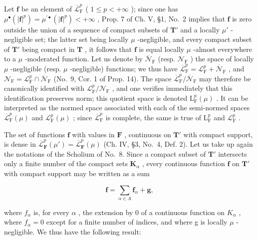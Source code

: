 Let \(\mathbf{f}\) be an element of \(\overline{\mathcal{L}}_{\mathrm{F}}^{p}\) ( \(1 \leqslant p < +\infty\) ); since one has \(\mu^{\bullet}(|\mathbf{f}|^{p}) = \mu^{\prime \bullet}(|\mathbf{f}|^{p}) < +\infty\) , Prop. 7 of Ch. V, §1, No.~2 implies that \(\mathbf{f}\) is zero outside the union of a sequence of compact subsets of \(\mathbf{T}'\) and a locally \(\mu'\) -negligible set; the latter set being locally \(\mu\) -negligible, and every compact subset of \(\mathbf{T}'\) being compact in \(\mathbf{T}\) , it follows that \(\mathbf{f}\) is equal locally \(\mu\) -almost everywhere to a \(\mu\) -moderated function. Let us denote by \(\overline{\mathcal{N}}_{\mathrm{F}}\) (resp. \(\mathcal{N}_{\mathrm{F}}\) ) the space of locally \(\mu\) -negligible (resp. \(\mu\) -negligible) functions; we thus have \(\overline{\mathcal{L}}_{\mathrm{F}}^{p} = \mathcal{L}_{\mathrm{F}}^{p} + \overline{\mathcal{N}}_{\mathrm{F}}\) , and \(\mathcal{N}_{\mathrm{F}} = \mathcal{L}_{\mathrm{F}}^{p} \cap \overline{\mathcal{N}}_{\mathrm{F}}\) (No.~9, Cor. 1 of Prop. 14). The space \(\overline{\mathcal{L}}_{\mathrm{F}}^{p} / \overline{\mathcal{N}}_{\mathrm{F}}\) may therefore be canonically identified with \(\mathcal{L}_{\mathrm{F}}^{p} / \mathcal{N}_{\mathrm{F}}\) , and one verifies immediately that this identification preserves norm; this quotient space is denoted \(\mathrm{L}_{\mathrm{F}}^{p}(\mu)\) . It can be interpreted as the normed space associated with each of the semi-normed spaces \(\overline{\mathcal{L}}_{\mathrm{F}}^{p}(\mu)\) and \(\mathcal{L}_{\mathrm{F}}^{p}(\mu)\) ; since \(\overline{\mathcal{L}}_{\mathrm{F}}^{p}\) is complete, the same is true of \(\mathrm{L}_{\mathrm{F}}^{p}\) and \(\mathcal{L}_{\mathrm{F}}^{p}\) .

The set of functions \(\mathbf{f}\) with values in \(\mathbf{F}\) , continuous on \(\mathbf{T}'\) with compact support, is dense in \(\overline{\mathcal{L}}_{\mathbf{F}}^{p}(\mu') = \overline{\mathcal{L}}_{\mathbf{F}}^{p}(\mu)\) (Ch. IV, §3, No.~4, Def. 2). Let us take up again the notations of the Scholium of No.~8. Since a compact subset of \(\mathbf{T}'\) intersects only a finite number of the compact sets \(\mathbf{K}_{\alpha}\) , every continuous function \(\mathbf{f}\) on \(\mathbf{T}'\) with compact support may be written as a sum

\[
\mathbf {f} = \sum_ {\alpha \in A} \mathbf {f} _ {\alpha} + \mathbf {g},
\]

where \(f_{\alpha}\) is, for every \(\alpha\) , the extension by 0 of a continuous function on \(K_{\alpha}\) , where \(f_{\alpha}=0\) except for a finite number of indices, and where g is locally \(\mu\) -negligible. We thus have the following result:

